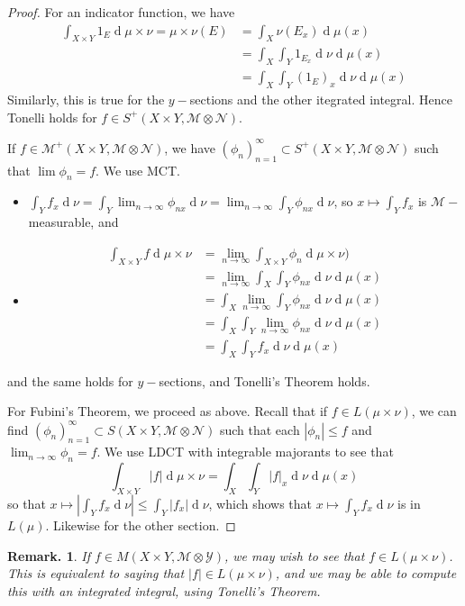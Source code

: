 \documentclass[11pt, a4paper]{memoir}
\theoremstyle{change}
\theoremstyle{plain}
\theoremstyle{nonumberplain}
\newtheorem{remark}{Remark.}
\newtheorem{proof}{Proof}
\renewcommand{\d}[1]{\ensuremath{\operatorname{d}\!{#1}}}
\numberwithin{equation}{section}
\begin{document}
\begin{proof}
    For an indicator function, we have
    \begin{align*}
        \int_{X\times Y}1_E\d{\mu\times\nu}=\mu\times\nu(E)&=\int_X\nu(E_x)\d{\mu(x)}\\
                                                           &=\int_X\int_Y1_{E_x}\d{\nu}\d{\mu(x)}\\
                                                           &= \int_X\int_Y(1_E)_x\d{\nu}\d{\mu(x)}
    \end{align*}
    Similarly, this is true for the $y-$sections and the other itegrated integral.
    Hence Tonelli holds for $f\in S^+(X\times Y,\mathcal{M}\otimes\mathcal{N})$.

    If $f\in\mathcal{M}^+(X\times Y,\mathcal{M}\otimes\mathcal{N})$, we have $(\phi_n)_{n=1}^\infty\subset S^+(X\times Y,\mathcal{M}\otimes\mathcal{N})$ such that $\lim\phi_n=f$.
    We use MCT.
    \begin{itemize}
        \item $\int_Y f_x\d{\nu}=\int_Y\lim_{n\to\infty}\phi_{nx}\d{\nu}=\lim_{n\to\infty}\int_Y\phi_{nx}\d{\nu}$, so $x\mapsto\int_Y f_x$ is $\mathcal{M}-$measurable, and
        \item
            \begin{align*}
                \int_{X\times Y}f\d{\mu\times\nu} &= \lim_{n\to\infty}\int_{X\times Y}\phi_n\d{\mu\times\nu)}\\
                                                  &= \lim_{n\to\infty}\int_X\int_Y\phi_{nx}\d{\nu}\d{\mu(x)}\\
                                                  &= \int_X\lim_{n\to\infty}\int_Y\phi_{nx}\d{\nu}\d{\mu(x)}\\
                                                  &= \int_X\int_Y\lim_{n\to\infty}\phi_{nx}\d{\nu}\d{\mu(x)}\\
                                                  &= \int_X\int_Y f_x\d{\nu}\d{\mu(x)}
            \end{align*}
    \end{itemize}
    and the same holds for $y-$sections, and Tonelli's Theorem holds.

    For Fubini's Theorem, we proceed as above.
    Recall that if $f\in L(\mu\times\nu)$, we can find $(\phi_n)_{n=1}^\infty\subset S(X\times Y,\mathcal{M}\otimes\mathcal{N})$ such that each $|\phi_n|\leq f$ and $\lim_{n\to\infty}\phi_n=f$.
    We use LDCT with integrable majorants to see that
    \begin{equation*}
        \int_{X\times Y}|f|\d{\mu\times\nu}=\int_X\int_Y|f|_x\d{\nu}\d{\mu(x)}
    \end{equation*}
    so that $x\mapsto\left\lvert\int_Yf_x\d{\nu}\right\rvert\leq\int_Y|f_x|\d{\nu}$, which shows that $x\mapsto\int_Yf_x\d{\nu}$ is in $L(\mu)$.
    Likewise for the other section.
\end{proof}
\begin{remark}
    If $f\in M(X\times Y,\mathcal{M}\otimes\mathcal{Y})$, we may wish to see that $f\in L(\mu\times\nu)$.
    This is equivalent to saying that $|f|\in L(\mu\times\nu)$, and we may be able to compute this with an integrated integral, using Tonelli's Theorem.
\end{remark}
\end{document}
